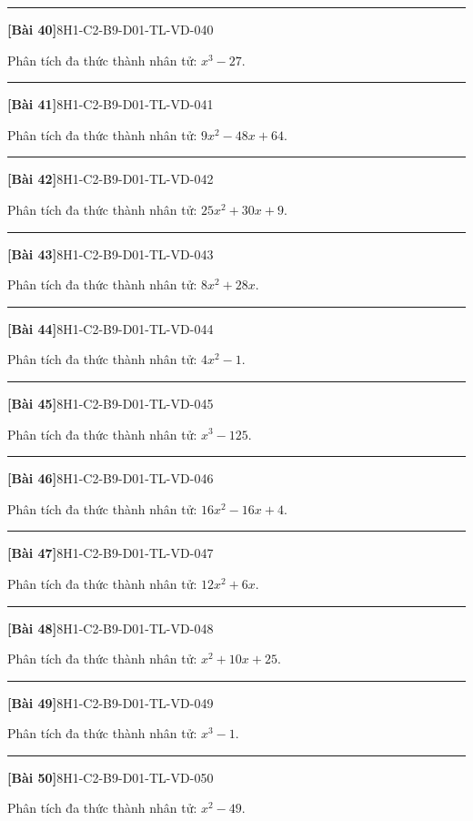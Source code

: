 \documentclass[12pt,a4paper]{article}
\newif\ifloigiai
\newenvironment{cauhoi}[2]{%
  \par\medskip\noindent\rule{\textwidth}{0.4pt}\par\nopagebreak
  \noindent\textbf{[#1]}\hfill{\scriptsize\ttfamily #2}\par\nopagebreak\smallskip}{\par}
\newcommand{\loigiai}[1]{\ifloigiai\par\smallskip\noindent\textit{Lời giải.} #1\par\fi}
\begin{document}
\begin{cauhoi}{Bài 40}{8H1-C2-B9-D01-TL-VD-040}
Phân tích đa thức thành nhân tử: $x^{3}-27$.
\loigiai{$x^{3}-3^{3}=(x-3)(x^{2}+3x+9)$.}
\end{cauhoi}
\begin{cauhoi}{Bài 41}{8H1-C2-B9-D01-TL-VD-041}
Phân tích đa thức thành nhân tử: $9x^{2} - 48x + 64$.
\loigiai{$9x^{2} - 48x + 64=(3x)^{2}-2\cdot(3x)\cdot 8+8^{2}=(3x - 8)^{2}$.}
\end{cauhoi}
\begin{cauhoi}{Bài 42}{8H1-C2-B9-D01-TL-VD-042}
Phân tích đa thức thành nhân tử: $25x^{2} + 30x + 9$.
\loigiai{$25x^{2} + 30x + 9=(5x)^{2}+2\cdot(5x)\cdot 3+3^{2}=(5x + 3)^{2}$.}
\end{cauhoi}
\begin{cauhoi}{Bài 43}{8H1-C2-B9-D01-TL-VD-043}
Phân tích đa thức thành nhân tử: $8x^{2} + 28x$.
\loigiai{Nhân tử chung của các hạng tử là $4x$. Vậy $8x^{2} + 28x=4x(2x + 7)$.}
\end{cauhoi}
\begin{cauhoi}{Bài 44}{8H1-C2-B9-D01-TL-VD-044}
Phân tích đa thức thành nhân tử: $4x^{2} - 1$.
\loigiai{$4x^{2} - 1=(2x)^{2}-1^{2}=(2x - 1)(2x + 1)$.}
\end{cauhoi}
\begin{cauhoi}{Bài 45}{8H1-C2-B9-D01-TL-VD-045}
Phân tích đa thức thành nhân tử: $x^{3}-125$.
\loigiai{$x^{3}-5^{3}=(x-5)(x^{2}+5x+25)$.}
\end{cauhoi}
\begin{cauhoi}{Bài 46}{8H1-C2-B9-D01-TL-VD-046}
Phân tích đa thức thành nhân tử: $16x^{2} - 16x + 4$.
\loigiai{$16x^{2} - 16x + 4=(4x)^{2}-2\cdot(4x)\cdot 2+2^{2}=(4x - 2)^{2}$.}
\end{cauhoi}
\begin{cauhoi}{Bài 47}{8H1-C2-B9-D01-TL-VD-047}
Phân tích đa thức thành nhân tử: $12x^{2} + 6x$.
\loigiai{Nhân tử chung của các hạng tử là $6x$. Vậy $12x^{2} + 6x=6x(2x + 1)$.}
\end{cauhoi}
\begin{cauhoi}{Bài 48}{8H1-C2-B9-D01-TL-VD-048}
Phân tích đa thức thành nhân tử: $x^{2} + 10x + 25$.
\loigiai{Nhóm hạng tử: $x^{2} + 10x + 25=(x^{2} + 5x)+(5x + 25)=x(x + 5)+5(x + 5)=(x + 5)(x + 5)$.}
\end{cauhoi}
\begin{cauhoi}{Bài 49}{8H1-C2-B9-D01-TL-VD-049}
Phân tích đa thức thành nhân tử: $x^{3}-1$.
\loigiai{$x^{3}-1^{3}=(x-1)(x^{2}+x+1)$.}
\end{cauhoi}
\begin{cauhoi}{Bài 50}{8H1-C2-B9-D01-TL-VD-050}
Phân tích đa thức thành nhân tử: $x^{2} - 49$.
\loigiai{$x^{2} - 49=(x)^{2}-7^{2}=(x - 7)(x + 7)$.}
\end{cauhoi}
\end{document}
